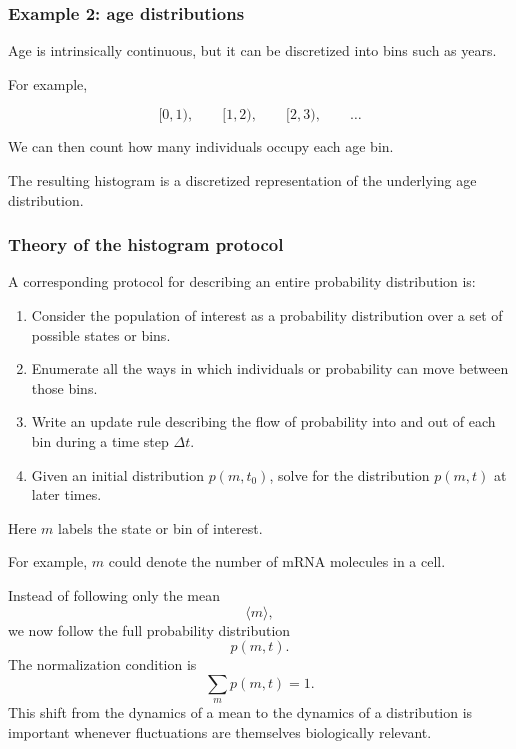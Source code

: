 \subsubsection*{Example 2: age distributions}

Age is intrinsically continuous, but it can be discretized into bins such as years.

For example,

\[
    [0,1), \qquad [1,2), \qquad [2,3), \qquad \ldots
\]

We can then count how many individuals occupy each age bin.

The resulting histogram is a discretized representation of the underlying age distribution.


\subsubsection{Theory of the histogram protocol}

A corresponding protocol for describing an entire probability distribution is:

\begin{enumerate}
    \item Consider the population of interest as a probability distribution over a set of possible states or bins.
    \item Enumerate all the ways in which individuals or probability can move between those bins.
    \item Write an update rule describing the flow of probability into and out of each bin during a time step $\Delta t$.
    \item Given an initial distribution $p(m,t_0)$, solve for the distribution $p(m,t)$ at later times.
\end{enumerate}

Here $m$ labels the state or bin of interest.

For example, $m$ could denote the number of mRNA molecules in a cell.

Instead of following only the mean
\[
    \langle m\rangle,
\]
we now follow the full probability distribution
\[
    p(m,t).
\]
The normalization condition is
\[
    \sum_m p(m,t)=1.
\]
This shift from the dynamics of a mean to the dynamics of a distribution is important whenever fluctuations are themselves biologically relevant.


